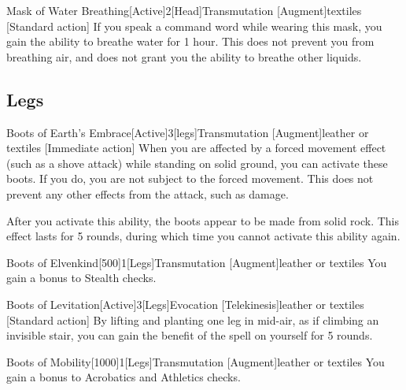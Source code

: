 \begin{magicitemdef}{Mask of Water Breathing}[Active]{2}[Head]{Transmutation [Augment]}{textiles}
    [Standard action] If you speak a command word while wearing this mask, you gain the ability to breathe water for 1 hour.
    This does not prevent you from breathing air, and does not grant you the ability to breathe other liquids.
\end{magicitemdef}

\subsection{Legs}

\begin{magicitemdef}{Boots of Earth's Embrace}[Active]{3}[legs]{Transmutation [Augment]}{leather or textiles}
    [Immediate action] When you are affected by a forced movement effect (such as a shove attack) while standing on solid ground, you can activate these boots.
    If you do, you are not subject to the forced movement.
    This does not prevent any other effects from the attack, such as damage.

    After you activate this ability, the boots appear to be made from solid rock.
    This effect lasts for 5 rounds, during which time you cannot activate this ability again.
\end{magicitemdef}

\begin{magicitemdef}{Boots of Elvenkind}[500]{1}[Legs]{Transmutation [Augment]}{leather or textiles}
     You gain a  bonus to Stealth checks.
\end{magicitemdef}

\begin{magicitemdef}{Boots of Levitation}[Active]{3}[Legs]{Evocation [Telekinesis]}{leather or textiles}
    [Standard action] By lifting and planting one leg in mid-air, as if climbing an invisible stair, you can gain the benefit of the  spell on yourself for 5 rounds.
\end{magicitemdef}

\begin{magicitemdef}{Boots of Mobility}[1000]{1}[Legs]{Transmutation [Augment]}{leather or textiles}
     You gain a  bonus to Acrobatics and Athletics checks.
\end{magicitemdef}

